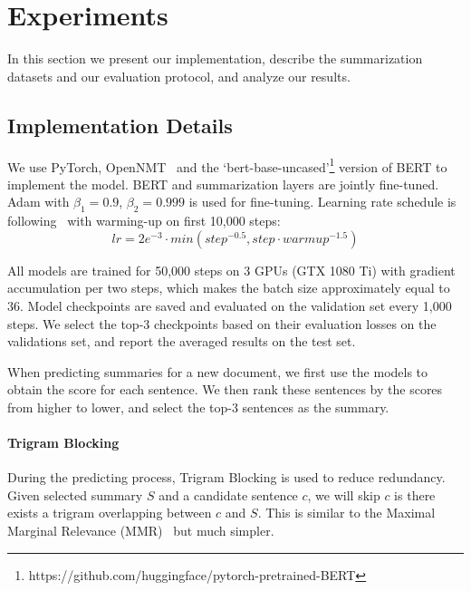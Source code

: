 \documentclass[11pt,a4paper]{article}
\begin{document}
    \section{Experiments}
    In this section we present our  implementation, describe the
    summarization datasets and  our evaluation protocol, and analyze our results.
    
    
    \subsection{Implementation Details} 
    
    We use PyTorch, OpenNMT~\cite{klein2017opennmt} and the `bert-base-uncased'\footnote{https://github.com/huggingface/pytorch-pretrained-BERT} version of BERT to implement the model. 
    BERT and summarization layers are jointly fine-tuned.
    Adam with  $\beta_1=0.9$, $\beta_2=0.999$ is used for fine-tuning. Learning rate schedule is following~\cite{vaswani2017attention} with warming-up on first 10,000 steps:
    \begin{equation}
    \nonumber lr = 2e^{-3}\cdot min(step^{-0.5}, step \cdot warmup^{-1.5})
    \end{equation}
    
    
    All models are trained for 50,000 steps on 3 GPUs (GTX 1080 Ti) with gradient accumulation per two steps, which makes the batch size approximately equal to $36$.
    Model checkpoints are saved and evaluated on the validation set every 1,000 steps. We select the top-3 checkpoints based on their evaluation losses on the validations set, and report the averaged results on the test set.
    
    When predicting summaries for a new document, we first use the  models to obtain the score for each sentence.
    We then rank these sentences by the scores from higher to lower, and select the top-3 sentences as the summary.
    
    \paragraph{Trigram Blocking} 
    During the predicting process, Trigram Blocking is used to reduce redundancy.
    Given selected summary $S$ and a candidate sentence $c$, we will skip $c$ is there exists a trigram overlapping between $c$ and $S$. This is similar to the Maximal Marginal Relevance (MMR)~\cite{carbonell1998use}  but much simpler.
    
    
\end{document}
